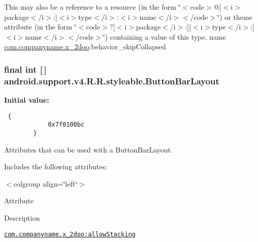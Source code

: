 This may also be a reference to a resource (in the form \char`\"{}$<$code$>$@\mbox{[}$<$i$>$package$<$/i$>$:\mbox{]}$<$i$>$type$<$/i$>$:$<$i$>$name$<$/i$>$$<$/code$>$\char`\"{}) or theme attribute (in the form \char`\"{}$<$code$>$?\mbox{[}$<$i$>$package$<$/i$>$:\mbox{]}\mbox{[}$<$i$>$type$<$/i$>$:\mbox{]}$<$i$>$name$<$/i$>$$<$/code$>$\char`\"{}) containing a value of this type.  name \hyperlink{namespacecom_1_1companyname_1_1x__2doo}{com.companyname.x\_\-2doo}:behavior\_\-skipCollapsed \hypertarget{classandroid_1_1support_1_1v4_1_1_r_1_1styleable_89ab1bc4e8f12a7cf690670f5c8f2e54}{
\subsubsection[{ButtonBarLayout}]{\setlength{\rightskip}{0pt plus 5cm}final int \mbox{[}$\,$\mbox{]} android.support.v4.R.R.styleable.ButtonBarLayout}}
\label{classandroid_1_1support_1_1v4_1_1_r_1_1styleable_89ab1bc4e8f12a7cf690670f5c8f2e54}


\textbf{Initial value:}

\begin{Code}\begin{verbatim} {
            0x7f0100bc
        }
\end{verbatim}
\end{Code}
Attributes that can be used with a ButtonBarLayout. 

Includes the following attributes: \begin{TabularC}{0}
\hline
\end{TabularC}
$<$colgroup align=\char`\"{}left\char`\"{}$>$ 

Attribute

Description 

{\tt \hyperlink{classandroid_1_1support_1_1v4_1_1_r_1_1styleable_dfe9fca963c8e4366d8e5dedf151f185}{com.companyname.x\_\-2doo:allowStacking}}

